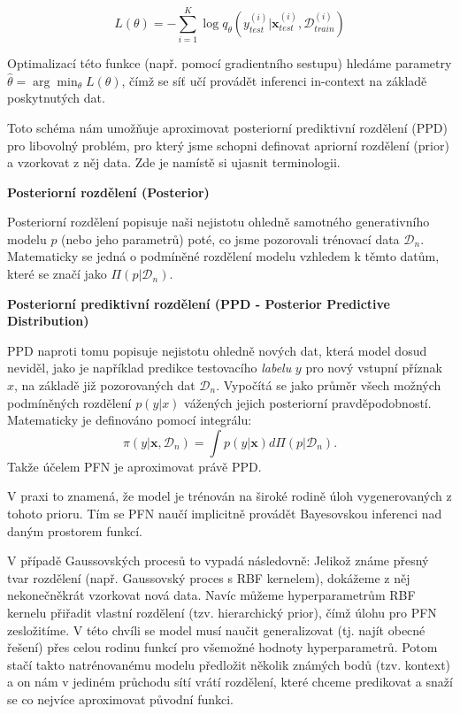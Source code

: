 $$L(\theta) = - \sum_{i=1}^{K} \log q_{\theta}(y^{(i)}_{test} | \mathbf{x}^{(i)}_{test}, \mathcal{D}^{(i)}_{train})$$

Optimalizací této funkce (např. pomocí gradientního sestupu) hledáme parametry $\hat{\theta} = \arg\min_{\theta} L(\theta)$, čímž se síť učí provádět inferenci in-context na základě poskytnutých dat.
\par   

Toto schéma nám umožňuje aproximovat posteriorní prediktivní rozdělení (PPD) pro libovolný problém, pro který jsme schopni definovat apriorní rozdělení (prior) a vzorkovat z něj data.
Zde je namístě si ujasnit terminologii.

\textbf{Posteriorní rozdělení (Posterior)}

Posteriorní rozdělení popisuje naši nejistotu ohledně samotného generativního modelu $p$ (nebo jeho parametrů) poté, co jsme pozorovali trénovací data $\mathcal{D}_n$.
Matematicky se jedná o podmíněné rozdělení modelu vzhledem k těmto datům, které se značí jako $\Pi(p|\mathcal{D}_n)$.

\textbf{Posteriorní prediktivní rozdělení (PPD - Posterior Predictive Distribution)}

PPD naproti tomu popisuje nejistotu ohledně nových dat, která model dosud neviděl, jako je například predikce testovacího \emph{labelu} $y$ pro nový vstupní příznak $x$, na základě již pozorovaných dat $\mathcal{D}_n$.
Vypočítá se jako průměr všech možných podmíněných rozdělení $p(y|x)$ vážených jejich posteriorní pravděpodobností. 
Matematicky je definováno pomocí integrálu:
$$ \pi(y|\mathbf{x},\mathcal{D}_n) = \int p(y|\mathbf{x})d\Pi(p|\mathcal{D}_n). $$
Takže účelem PFN je aproximovat právě PPD.

V praxi to znamená, že model je trénován na široké rodině úloh vygenerovaných z tohoto prioru. 
Tím se PFN naučí implicitně provádět Bayesovskou inferenci nad daným prostorem funkcí.

V případě Gaussovských procesů to vypadá následovně: Jelikož známe přesný tvar rozdělení (např. Gaussovský proces s RBF kernelem), dokážeme z něj nekonečněkrát vzorkovat nová data. 
Navíc můžeme hyperparametrům RBF kernelu přiřadit vlastní rozdělení (tzv. hierarchický prior), čímž úlohu pro PFN zesložitíme.
V této chvíli se model musí naučit generalizovat (tj. najít obecné řešení) přes celou rodinu funkcí pro všemožné hodnoty hyperparametrů. 
Potom stačí takto natrénovanému modelu předložit několik známých bodů (tzv. kontext) a on nám v jediném průchodu sítí vrátí rozdělení, které chceme predikovat a snaží se co nejvíce aproximovat původní funkci.
\par

